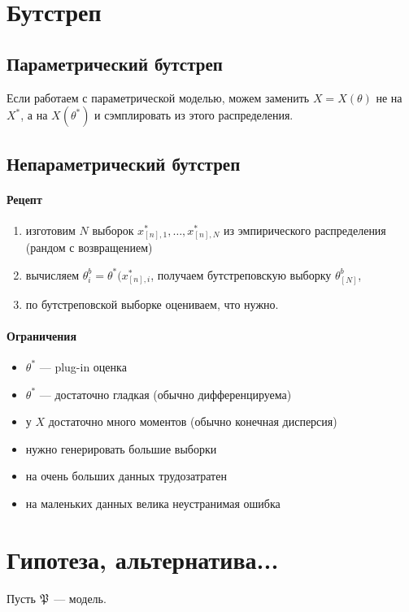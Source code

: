 \documentclass[11pt]{book}
\begin{document}
\section{Бутстреп}
\subsection{Параметрический бутстреп}
Если работаем с параметрической моделью, можем заменить $X=X(\theta)$ не на $X^*$, а на $X(\theta^*)$ и сэмплировать из этого распределения.
\subsection{Непараметрический бутстреп }
\paragraph{Рецепт}
\begin{enumerate}
	\item изготовим $N$ выборок $x^*_{[n], 1}, \ldots , x^*_{[n], N}$ из эмпирического распределения (рандом с возвращением)
	\item вычисляем $\theta^{b}_{i} = \theta^*(x^*_{[n], i}$, получаем бутстреповскую выборку $\theta^{b}_{[N]}$,
	\item по бутстреповской выборке оцениваем, что нужно.
\end{enumerate}
\paragraph{Ограничения}
\begin{itemize}
	\item $\theta^*$ --- plug-in оценка
    \item $\theta^*$ --- достаточно гладкая (обычно дифференцируема)
	\item у  $X$ достаточно много моментов (обычно конечная дисперсия)
	\item нужно генерировать большие выборки
	\item на очень больших данных трудозатратен
	\item на маленьких данных велика неустранимая ошибка
\end{itemize}

\section{Гипотеза, альтернатива...}
Пусть $\mathfrak{P}$ --- модель.
\end{document}
